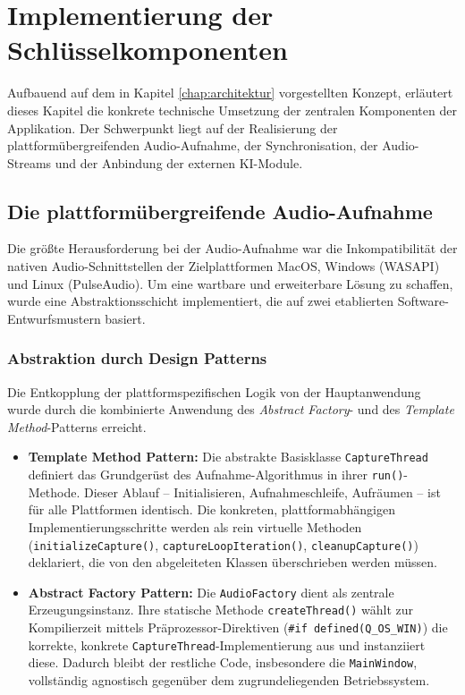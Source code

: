 
\chapter{Implementierung der Schlüsselkomponenten}
\label{chap:implementierung}

Aufbauend auf dem in Kapitel \ref{chap:architektur} vorgestellten Konzept, erläutert dieses Kapitel die konkrete technische Umsetzung der zentralen Komponenten der Applikation. Der Schwerpunkt liegt auf der Realisierung der plattformübergreifenden Audio-Aufnahme, der Synchronisation, der Audio-Streams und der Anbindung der externen KI-Module.


\section{Die plattformübergreifende Audio-Aufnahme}
\label{sec:audio_aufnahme}

Die größte Herausforderung bei der Audio-Aufnahme war die Inkompatibilität der nativen Audio-Schnittstellen der Zielplattformen MacOS, Windows (WASAPI) und Linux (PulseAudio). Um eine wartbare und erweiterbare Lösung zu schaffen, wurde eine Abstraktionsschicht implementiert, die auf zwei etablierten Software-Entwurfsmustern basiert.

\subsection{Abstraktion durch Design Patterns}

Die Entkopplung der plattformspezifischen Logik von der Hauptanwendung wurde durch die kombinierte Anwendung des \textit{Abstract Factory}- und des \textit{Template Method}-Patterns erreicht.

\begin{itemize}
    \item \textbf{Template Method Pattern:} Die abstrakte Basisklasse \texttt{CaptureThread} definiert das Grundgerüst des Aufnahme-Algorithmus in ihrer \texttt{run()}-Methode. Dieser Ablauf -- Initialisieren, Aufnahmeschleife, Aufräumen -- ist für alle Plattformen identisch. Die konkreten, plattformabhängigen Implementierungsschritte werden als rein virtuelle Methoden (\texttt{initializeCapture()}, \texttt{captureLoopIteration()}, \texttt{cleanupCapture()}) deklariert, die von den abgeleiteten Klassen überschrieben werden müssen.
    \item \textbf{Abstract Factory Pattern:} Die \texttt{AudioFactory} dient als zentrale Erzeugungsinstanz. Ihre statische Methode \texttt{createThread()} wählt zur Kompilierzeit mittels Präprozessor-Direktiven (\texttt{\#if defined(Q\_OS\_WIN)}) die korrekte, konkrete \texttt{CaptureThread}-Implementierung aus und instanziiert diese. Dadurch bleibt der restliche Code, insbesondere die \texttt{MainWindow}, vollständig agnostisch gegenüber dem zugrundeliegenden Betriebssystem.
\end{itemize}

